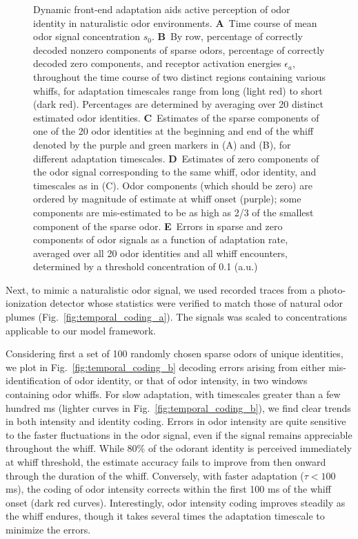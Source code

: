 \begin{figure}[!tb]
	\caption{\footnotesize{Dynamic front-end adaptation aids active perception of odor identity in naturalistic odor environments. \textbf{A}~Time course of mean odor signal concentration $s_0$. \textbf{B}~By row, percentage of correctly decoded nonzero components of sparse odors, percentage of correctly decoded zero components, and receptor activation energies $\epsilon_a$, throughout the time course of two distinct regions containing various whiffs, for adaptation timescales range from long (light red) to short (dark red). Percentages are determined by averaging over 20 distinct estimated odor identities. \textbf{C}~Estimates of the sparse components of one of the 20 odor identities at the beginning and end of the whiff denoted by the purple and green markers in (A) and (B), for different adaptation timescales. \textbf{D}~Estimates of zero components of the odor signal corresponding to the same whiff, odor identity, and timescales as in (C). Odor components (which should be zero) are ordered by magnitude of estimate at whiff onset (purple); some components are mis-estimated to be as high as 2/3 of the smallest component of the sparse odor. \textbf{E}~Errors in sparse and zero components of odor signals as a function of adaptation rate, averaged over all 20 odor identities and all whiff encounters, determined by a threshold concentration of 0.1 (a.u.)}}
	\label{fig:temporal_coding}
\end{figure}

Next, to mimic a naturalistic odor signal, we used recorded traces from a photo-ionization detector whose statistics were verified to match those of natural odor plumes (Fig.~\ref{fig:temporal_coding_a}). The signals was scaled to concentrations applicable to our model framework.

Considering first a set of 100 randomly chosen sparse odors of unique identities, we plot in Fig.~\ref{fig:temporal_coding_b} decoding errors arising from either mis-identification of odor identity, or that of odor intensity, in two windows containing odor whiffs. %
For slow adaptation, with timescales greater than a few hundred ms (lighter curves in Fig.~\ref{fig:temporal_coding_b}), we find clear trends in both intensity and identity coding. Errors in odor intensity are quite sensitive to the faster fluctuations in the odor signal, even if the signal remains appreciable throughout the whiff. While 80\% of the odorant identity is perceived immediately at whiff threshold, the estimate accuracy fails to improve from then onward through the duration of the whiff. Conversely, with faster adaptation ($\tau < 100$ ms), the coding of odor intensity corrects within the first 100 ms of the whiff onset (dark red curves). Interestingly, odor intensity coding improves steadily as the whiff endures, though it takes several times the adaptation timescale to minimize the errors. 




